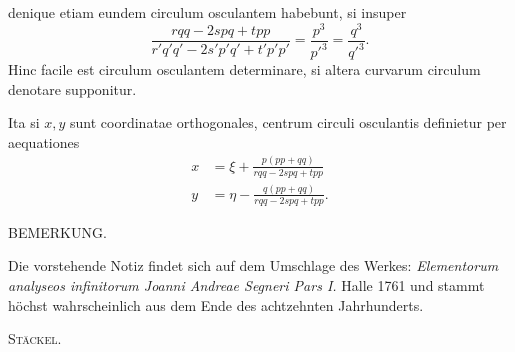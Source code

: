 %
denique etiam eundem circulum osculantem habebunt, si insuper
\[
\frac{rqq-2spq+tpp}{r'q'q'-2s'p'q'+t'p'p'}=\frac{p^3}{p'^3}=\frac{q^3}{q'^3}.
\]
Hinc facile est circulum osculantem determinare, si altera curvarum circulum denotare supponitur.

Ita si $x,y$ sunt coordinatae orthogonales, centrum circuli osculantis definietur per aequationes
\[
\begin{aligned}
x&=\xi+\frac{p(pp+qq)}{rqq-2spq+tpp}\\[5pt]
y&=\eta-\frac{q(pp+qq)}{rqq-2spq+tpp}.
\end{aligned}
\]
\begin{center}BEMERKUNG.\end{center}

Die vorstehende Notiz findet sich auf dem Umschlage des Werkes: \textit{Elementorum analyseos infinitorum Joanni Andreae Segneri Pars I.} Halle 1761 und stammt höchst wahrscheinlich aus dem Ende des achtzehnten Jahrhunderts.\par\nobreak\hfill\textsc{Stäckel.}\par

